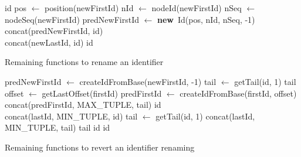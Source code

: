 \documentclass[12pt]{thesul}
\newcommand{\new}{\textbf{new}}
\begin{document}
\begin{algorithm}[!ht]
  \footnotesize
  \begin{algorithmic}
          \State \Return id
      \Else
          \State pos $\gets$ position(newFirstId)
          \State nId $\gets$ nodeId(newFirstId)
          \State nSeq $\gets$ nodeSeq(newFirstId)
          \State predNewFirstId $\gets$ \new~Id(pos, nId, nSeq, -1)
          \\
          \State \Return concat(predNewFirstId, id)
          \EndIf
      \EndFunction
      \\
              \State \Return concat(newLastId, id)
          \Else
              \State \Return id
          \EndIf
      \EndFunction
  \end{algorithmic}
  \caption{Remaining functions to rename an identifier}
  \label{alg:appendix-rename-id}
\end{algorithm}


\label{app:revert-rename-id}

\begin{algorithm}[!ht]
  \footnotesize
  \begin{algorithmic}
          \State predNewFirstId $\gets$ createIdFromBase(newFirstId, -1)
              \State tail $\gets$ getTail(id, 1)
                  \State \Return tail
              \Else
                  \State {}
                  \State offset $\gets$ getLastOffset(firstId)
                  \State predFirstId $\gets$ createIdFromBase(firstId, offset)
                  \State \Return concat(predFirstId, MAX\_TUPLE, tail)
              \EndIf
          \Else
              \State \Return id
          \EndIf
      \EndFunction
      \\
              \State {}
              \State \Return concat(lastId, MIN\_TUPLE, id)
              \State tail $\gets$ getTail(id, 1)
                  \State {}
                  \State \Return concat(lastId, MIN\_TUPLE, tail)
                  \State \Return tail
              \Else
                  \State {}
                  \State \Return id
              \EndIf
          \Else
              \State \Return id
          \EndIf
      \EndFunction
  \end{algorithmic}
  \caption{Remaining functions to revert an identifier renaming}
  \label{alg:appendix-revert-rename-id}
\end{algorithm}
\end{document}
